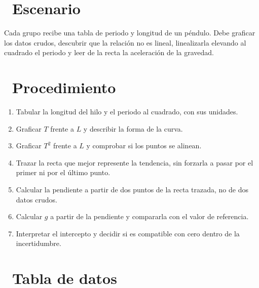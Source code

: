 \documentclass[11pt,a4paper]{article}
\newcommand{\iconotexto}[2]{\textcolor{cyanNeon}{\faIcon{#1}}~#2}
\begin{document}
\section{\iconotexto{flask}{Escenario}}

Cada grupo recibe una tabla de periodo y longitud de un péndulo. Debe graficar los datos crudos, descubrir que la relación no es lineal, linealizarla elevando al cuadrado el periodo y leer de la recta la aceleración de la gravedad.

\section{\iconotexto{list-ol}{Procedimiento}}

\begin{enumerate}[leftmargin=1.4em,itemsep=2pt,topsep=3pt]
  \item Tabular la longitud del hilo y el periodo al cuadrado, con sus unidades.
  \item Graficar $T$ frente a $L$ y describir la forma de la curva.
  \item Graficar $T^2$ frente a $L$ y comprobar si los puntos se alinean.
  \item Trazar la recta que mejor represente la tendencia, sin forzarla a pasar por el primer ni por el último punto.
  \item Calcular la pendiente a partir de dos puntos de la recta trazada, no de dos datos crudos.
  \item Calcular $g$ a partir de la pendiente y compararla con el valor de referencia.
  \item Interpretar el intercepto y decidir si es compatible con cero dentro de la incertidumbre.
\end{enumerate}

\section{\iconotexto{table}{Tabla de datos}}
\end{document}
